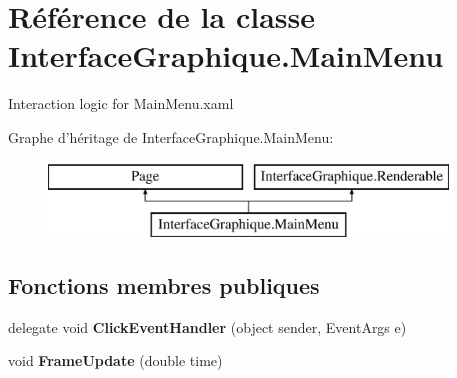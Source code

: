 \hypertarget{class_interface_graphique_1_1_main_menu}{\section{Référence de la classe Interface\-Graphique.\-Main\-Menu}
\label{class_interface_graphique_1_1_main_menu}
}


Interaction logic for Main\-Menu.\-xaml  


Graphe d'héritage de Interface\-Graphique.\-Main\-Menu\-:\begin{figure}[H]
\begin{center}
\leavevmode
\includegraphics[height=2.000000cm]{class_interface_graphique_1_1_main_menu}
\end{center}
\end{figure}
\subsection*{Fonctions membres publiques}
\begin{DoxyCompactItemize}
\item 
\hypertarget{class_interface_graphique_1_1_main_menu_a5f5f0df5c4abb8f172887e8b307dc32d}{delegate void {\bfseries Click\-Event\-Handler} (object sender, Event\-Args e)}\label{class_interface_graphique_1_1_main_menu_a5f5f0df5c4abb8f172887e8b307dc32d}

\item 
\hypertarget{class_interface_graphique_1_1_main_menu_ae92a15c3a8b243af60860bfe6c0a759e}{void {\bfseries Frame\-Update} (double time)}\label{class_interface_graphique_1_1_main_menu_ae92a15c3a8b243af60860bfe6c0a759e}

\end{DoxyCompactItemize}
